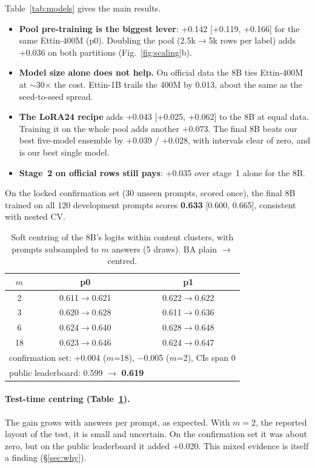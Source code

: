 \documentclass[10pt,twocolumn,letterpaper]{article}
\begin{document}
Table~\ref{tab:models} gives the main results.
\begin{itemize}
\item \textbf{Pool pre-training is the biggest lever}: +0.142 [+0.119, +0.166] for the same Ettin-400M (p0). Doubling the pool (2.5k$\to$5k rows per label) adds +0.036 on both partitions (Fig.~\ref{fig:scaling}b).
\item \textbf{Model size alone does not help.} On official data the 8B ties Ettin-400M at $\sim$30$\times$ the cost. Ettin-1B trails the 400M by 0.013, about the same as the seed-to-seed spread.
\item \textbf{The LoRA24 recipe} adds +0.043 [+0.025, +0.062] to the 8B at equal data. Training it on the whole pool adds another +0.073. The final 8B beats our best five-model ensemble by +0.039 / +0.028, with intervals clear of zero, and is our best single model.
\item \textbf{Stage~2 on official rows still pays}: +0.035 over stage~1 alone for the 8B.
\end{itemize}
On the locked confirmation set (30 unseen prompts, scored once), the final 8B trained on all 120 development prompts scores \textbf{0.633} [0.600, 0.665], consistent with nested CV.

\begin{table}[t]
\centering\small
\caption{Soft centring of the 8B's logits within content clusters, with prompts subsampled to $m$ answers (5 draws). BA plain $\to$ centred.}
\label{tab:centring}
\begin{tabular}{ccc}
\toprule
$m$ & p0 & p1 \\
\midrule
2 & 0.611$\to$0.621 & 0.622$\to$0.622 \\
3 & 0.620$\to$0.628 & 0.611$\to$0.636 \\
6 & 0.624$\to$0.640 & 0.628$\to$0.648 \\
18 & 0.623$\to$0.646 & 0.624$\to$0.647 \\
\midrule
\multicolumn{3}{l}{confirmation set: +0.004 ($m$=18), $-$0.005 ($m$=2), CIs span 0} \\
\multicolumn{3}{l}{public leaderboard: 0.599 $\to$ \textbf{0.619}} \\
\bottomrule
\end{tabular}
\end{table}

\paragraph{Test-time centring (Table~\ref{tab:centring}).} The gain grows with answers per prompt, as expected. With $m=2$, the reported layout of the test, it is small and uncertain. On the confirmation set it was about zero, but on the public leaderboard it added +0.020. This mixed evidence is itself a finding (\S\ref{sec:why}).
\end{document}
